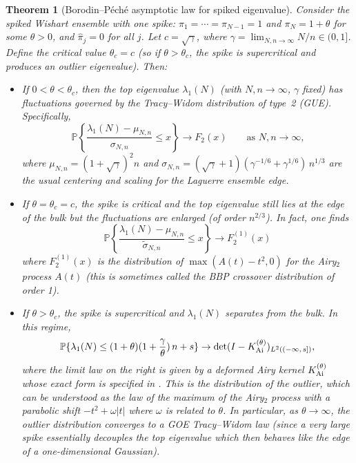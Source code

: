 \documentclass[letterpaper,11pt,oneside,reqno]{article}
\numberwithin{equation}{section}
\newtheorem{theorem}[proposition]{Theorem}
\theoremstyle{definition}
\begin{document}
\begin{theorem}[Borodin--P\'ech\'e asymptotic law for spiked eigenvalue]\label{thm:BP-limit}
Consider the spiked Wishart ensemble with one spike: $\pi_1=\cdots=\pi_{N-1}=1$ and $\pi_N = 1+\theta$ for some $\theta>0$, and $\hat\pi_j=0$ for all $j$. Let $c = \sqrt{\gamma}$, where $\gamma = \lim_{N,n\to\infty} N/n \in(0,1]$. Define the critical value $\theta_c = c$ (so if $\theta>\theta_c$, the spike is supercritical and produces an outlier eigenvalue). Then:
\begin{itemize}\item If $0<\theta < \theta_c$, then the top eigenvalue $\lambda_1(N)$ (with $N,n\to\infty$, $\gamma$ fixed) has fluctuations governed by the Tracy--Widom distribution of type~2 (GUE). Specifically,
\[ \mathbb{P}\left\{\frac{\lambda_1(N) - \mu_{N,n}}{\sigma_{N,n}} \le x\right\} \to F_2(x) \qquad \text{as $N,n\to\infty$,}\]
where $\mu_{N,n} = (1+\sqrt{\gamma})^2 n$ and $\sigma_{N,n} = (\sqrt{\gamma}+1)(\gamma^{-1/6}+\gamma^{1/6})\, n^{1/3}$ are the usual centering and scaling for the Laguerre ensemble edge.
\item If $\theta = \theta_c = c$, the spike is critical and the top eigenvalue still lies at the edge of the bulk but the fluctuations are enlarged (of order $n^{2/3}$). In fact, one finds
\[ \mathbb{P}\left\{\frac{\lambda_1(N) - \mu_{N,n}}{\tilde\sigma_{N,n}} \le x\right\} \to F_2^{(1)}(x) \]
where $F_2^{(1)}(x)$ is the distribution of $\max(A(t)-t^2,0)$ for the Airy$_2$ process $A(t)$ (this is sometimes called the BBP crossover distribution of order 1).
\item If $\theta > \theta_c$, the spike is supercritical and $\lambda_1(N)$ separates from the bulk. In this regime,
\[ \mathbb{P}\{\lambda_1(N) \le (1+\theta)(1+\frac{\gamma}{\theta})\, n + s\} \to \det(I - K_{\rm Ai}^{(\theta)})_{L^2((-\infty,\,s])},\]
where the limit law on the right is given by a deformed Airy kernel $K_{\rm Ai}^{(\theta)}$ whose exact form is specified in \cite{BorodinPeche2009}. This is the distribution of the outlier, which can be understood as the law of the maximum of the Airy$_2$ process with a parabolic shift $-t^2 + \omega |t|$ where $\omega$ is related to $\theta$. In particular, as $\theta\to\infty$, the outlier distribution converges to a GOE Tracy--Widom law (since a very large spike essentially decouples the top eigenvalue which then behaves like the edge of a one-dimensional Gaussian).
\end{itemize}
\end{theorem}
\end{document}
